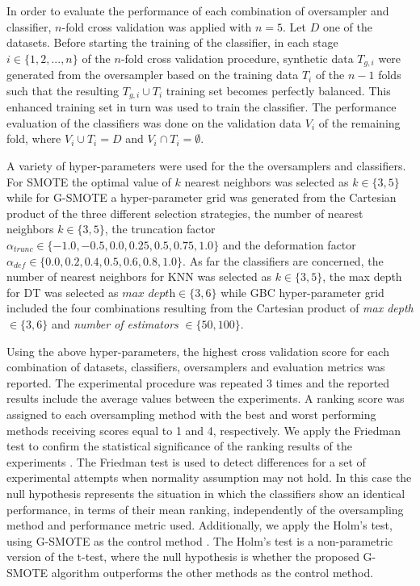 \documentclass[parskip=full]{scrartcl}
\begin{document}
In order to evaluate the performance of each combination of oversampler and classifier, \( n \)-fold cross validation was applied with \( n = 5 \). Let \(D\) one of the datasets. Before starting the training of the classifier, in each stage \(i \in \{1, 2 ,... , n \} \) of the \( n \)-fold cross validation procedure, synthetic data \( T_{g, i} \) were generated from the oversampler based on the training data \(T_{i} \) of the \( n - 1 \) folds such that the resulting \(T_{g, i} \cup T_{i} \) training set becomes perfectly balanced. This enhanced training set in turn was used to train the classifier. The performance evaluation of the classifiers was done on the validation data \( V_{i} \) of the remaining fold, where \(V_{i} \cup T_{i} = D \) and \(V_{i} \cap T_{i} = \emptyset \).

A variety of hyper-parameters were used for the the oversamplers and classifiers. For SMOTE the optimal value of \( k \) nearest neighbors was selected as \( k \in \{ 3, 5 \} \) while for G-SMOTE a hyper-parameter grid was generated from the Cartesian product of the three different selection strategies, the number of nearest neighbors \(k \in \{ 3, 5 \} \), the truncation factor \( \alpha_{trunc} \in \{ -1.0, -0.5, 0.0, 0.25, 0.5, 0.75 , 1.0 \} \) and the deformation factor \( \alpha_{def} \in \{ 0.0, 0.2, 0.4, 0.5, 0.6, 0.8, 1.0 \} \). As far the classifiers are concerned, the number of nearest neighbors for KNN was selected as \( k \in \{ 3, 5 \} \),  the max depth for DT was selected as \( \textit{max depth} \in \{ 3, 6 \} \) while GBC hyper-parameter grid included the four combinations resulting from the Cartesian product of  \textit{max depth} \( \in \{ 3 , 6 \} \) and \textit{number of estimators} \( \in \{50, 100\} \).

Using the above hyper-parameters, the highest cross validation score for each combination of datasets, classifiers, oversamplers and evaluation metrics was reported. The experimental procedure was repeated 3 times and the reported results include the average values between the experiments. A ranking score was assigned to each oversampling method with the best and worst performing methods receiving scores equal to 1 and 4, respectively. We apply the Friedman test to confirm the statistical significance of the ranking results of the experiments \cite{Guyon2003}. The Friedman test is used to detect differences for a set of experimental attempts when normality assumption may not hold. In this case the null hypothesis represents the situation in which the classifiers show an identical performance, in terms of their mean ranking, independently of the oversampling method and performance metric used.  Additionally, we apply the Holm’s test, using G-SMOTE as the control method \cite{Guyon2003}. The Holm’s test is a non-parametric version of the t-test, where the null hypothesis is whether the proposed G-SMOTE algorithm outperforms the other methods as the control method.
\end{document}
